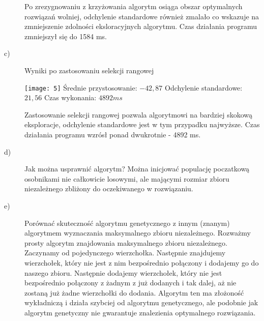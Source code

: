 \documentclass[11pt]{article}
\begin{document}
\begin{description}
Po zrezygnowaniu z krzyżowania algorytm osiąga obszar
optymalnych rozwiązań wolniej, odchylenie standardowe 
również zmalało co wskazuje na zmniejszenie zdolności 
eksloracyjnych algorytmu. Czas działania programu 
zmniejszył się do 1584 ms.

\newpage
\item[c)] Wyniki po zastosowaniu selekcji rangowej\newline

\texttt{[image: 5]}\newline
Średnie przystosowanie: $-42,87$\newline
Odchylenie standardowe: $21,56$\newline
Czas wykonania: $4892 ms$

Zastosowanie selekcji rangowej pozwala algorytmowi 
na bardziej skokową eksploracje, odchylenie standardowe
jest w tym przypadku najwyższe. Czas działania programu
wzrósł ponad dwukrotnie - 4892 ms.

\item[d)] Jak można usprawnić algorytm?\newline
Można inicjować populację poczatkową osobnikami nie całkowicie losowymi, ale
mającymi rozmiar zbioru niezależnego zbliżony do oczekiwanego w rozwiązaniu.
\item[e)] Porównać skuteczność algorytmu genetycznego z innym (znanym)
algorytmem wyznaczania maksymalnego zbioru niezależnego.\newline
Rozważmy prosty algorytm znajdowania maksymalnego zbioru niezależnego.
Zaczynamy od pojedynczego wierzchołka. Następnie znajdujemy wierzchołek,
który nie jest z nim bezpośrednio połączony i dodajemy go do naszego
zbioru. Następnie dodajemy wierzchołek, który nie jest bezpośrednio
połączony z żadnym z już dodanych i tak dalej, aż nie zostaną już
żadne wierzchołki do dodania.\newline
Algorytm ten ma złożoność wykładniczą i działa szybciej od algorytmu
genetycznego, ale podobnie jak algorytm genetyczny nie gwarantuje
znalezienia optymalnego rozwiązania.


\end{description}
\end{document}
